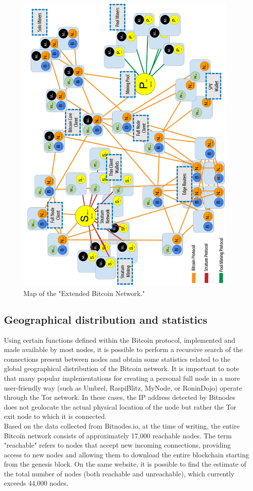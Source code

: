 \begin{figure}[h!]
\centering
\includegraphics[width=11cm,angle=270,origin=c]{Figures/bitcoin/tipo3.png}
\caption{Map of the "Extended Bitcoin Network."}
\label{fig:extended_network}
\end{figure}

\subsection{Geographical distribution and statistics}

Using certain functions defined within the Bitcoin protocol, implemented and made available by most nodes, it is possible to perform a recursive search of the connections present between nodes and obtain some statistics related to the global geographical distribution of the Bitcoin network. It is important to note that many popular implementations for creating a personal full node in a more user-friendly way (such as Umbrel, RaspiBlitz, MyNode, or RoninDojo) operate through the Tor network. In these cases, the IP address detected by Bitnodes does not geolocate the actual physical location of the node but rather the Tor exit node to which it is connected. \\
Based on the data collected from Bitnodes.io, at the time of writing, the entire Bitcoin network consists of approximately 17,000 reachable nodes. The term "reachable" refers to nodes that accept new incoming connections, providing access to new nodes and allowing them to download the entire blockchain starting from the genesis block. On the same website, it is possible to find the estimate of the total number of nodes (both reachable and unreachable), which currently exceeds 44,000 nodes. \cite{bitnodesGlobalBitcoin}

